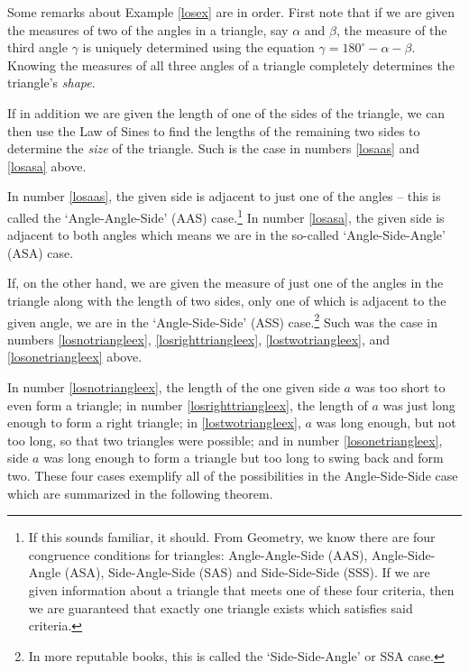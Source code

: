 Some remarks about Example \ref{losex} are in order. First note that if we are given the measures of two of the angles in a triangle, say $\alpha$ and $\beta$, the measure of the third angle $\gamma$ is uniquely determined using the equation  $\gamma = 180^{\circ} - \alpha - \beta$.  Knowing the measures of all three angles of a triangle completely determines the triangle's  \textit{shape}.

\smallskip

 If in addition we are given the length of one of the sides of the triangle, we can then use the Law of Sines to find the lengths of the remaining two sides to determine the \textit{size} of the triangle. Such is the case in numbers \ref{losaas} and \ref{losasa} above. 
 
 \smallskip
 
In number \ref{losaas}, the given side is adjacent to just one of the angles -- this is called the `Angle-Angle-Side' (AAS) case.\footnote{If this sounds familiar, it should.  From Geometry, we know there are four congruence conditions for triangles:  Angle-Angle-Side (AAS), Angle-Side-Angle (ASA), Side-Angle-Side (SAS) and Side-Side-Side (SSS).  If we are given information about a triangle that meets one of these four criteria, then we are guaranteed that exactly one triangle exists which satisfies said criteria.}  In number \ref{losasa}, the given side is adjacent to both angles which means we are in the so-called `Angle-Side-Angle' (ASA) case.

\smallskip

If, on the other hand, we are given the measure of just one of the angles in the triangle along with the length of two sides, only one of which is adjacent to the given angle, we are in the `Angle-Side-Side' (ASS) case.\footnote{In more reputable books, this is called the `Side-Side-Angle' or SSA case.}  Such was the case in numbers  \ref{losnotriangleex}, \ref{losrighttriangleex}, \ref{lostwotriangleex}, and  \ref{losonetriangleex} above.
 
\smallskip

In number \ref{losnotriangleex}, the length of the one given side $a$ was too short to even form a triangle;  in number \ref{losrighttriangleex}, the length of $a$ was just long enough to form a right triangle;  in \ref{lostwotriangleex}, $a$ was long enough, but not too long, so that two triangles were possible; and in number \ref{losonetriangleex}, side $a$ was long enough to form a triangle but too long to swing back and form two. These four cases exemplify all of the possibilities in the Angle-Side-Side case which are summarized in the following theorem.

